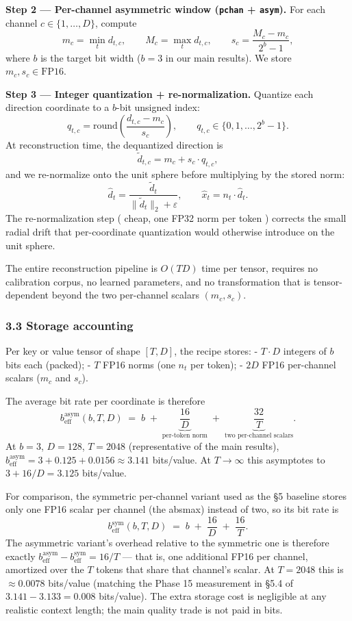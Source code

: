 \documentclass[
]{article}
\begin{document}
\textbf{Step 2 --- Per-channel asymmetric window (\texttt{pchan} +
\texttt{asym}).} For each channel \(c \in \{1, \dots, D\}\), compute \[
m_c = \min_{t} d_{t,c},\qquad M_c = \max_{t} d_{t,c},\qquad s_c = \frac{M_c - m_c}{2^{b} - 1},
\] where \(b\) is the target bit width (\(b = 3\) in our main results).
We store \(m_c, s_c \in \text{FP16}\).

\textbf{Step 3 --- Integer quantization + re-normalization.} Quantize
each direction coordinate to a \(b\)-bit unsigned index: \[
q_{t,c} = \mathrm{round}\!\left(\frac{d_{t,c} - m_c}{s_c}\right),\qquad q_{t,c} \in \{0, 1, \dots, 2^b - 1\}.
\] At reconstruction time, the dequantized direction is \[
\tilde{d}_{t,c} = m_c + s_c \cdot q_{t,c},
\] and we re-normalize onto the unit sphere before multiplying by the
stored norm: \[
\hat{d}_t = \frac{\tilde{d}_t}{\|\tilde{d}_t\|_2 + \varepsilon},\qquad \hat{x}_t = n_t \cdot \hat{d}_t.
\] The re-normalization step ( cheap, one FP32 norm per token ) corrects
the small radial drift that per-coordinate quantization would otherwise
introduce on the unit sphere.

The entire reconstruction pipeline is \(O(T D)\) time per tensor,
requires no calibration corpus, no learned parameters, and no
transformation that is tensor-dependent beyond the two per-channel
scalars \((m_c, s_c)\).

\subsubsection{3.3 Storage accounting}\label{storage-accounting}

Per key or value tensor of shape \([T, D]\), the recipe stores: -
\(T \cdot D\) integers of \(b\) bits each (packed); - \(T\) FP16 norms
(one \(n_t\) per token); - \(2D\) FP16 per-channel scalars (\(m_c\) and
\(s_c\)).

The average bit rate per coordinate is therefore \[
b_\text{eff}^\text{asym}(b, T, D) \;=\; b \;+\; \underbrace{\frac{16}{D}}_{\text{per-token norm}} \;+\; \underbrace{\frac{32}{T}}_{\text{two per-channel scalars}}.
\] At \(b = 3\), \(D = 128\), \(T = 2048\) (representative of the main
results),
\(b_\text{eff}^\text{asym} = 3 + 0.125 + 0.0156 \approx 3.141\)
bits/value. At \(T \to \infty\) this asymptotes to \(3 + 16/D = 3.125\)
bits/value.

For comparison, the symmetric per-channel variant used as the §5
baseline stores only one FP16 scalar per channel (the absmax) instead of
two, so its bit rate is \[
b_\text{eff}^\text{sym}(b, T, D) \;=\; b \;+\; \frac{16}{D} \;+\; \frac{16}{T}.
\] The asymmetric variant's overhead relative to the symmetric one is
therefore exactly
\(b_\text{eff}^\text{asym} - b_\text{eff}^\text{sym} = 16/T\) --- that
is, one additional FP16 per channel, amortized over the \(T\) tokens
that share that channel's scalar. At \(T = 2048\) this is
\(\approx 0.0078\) bits/value (matching the Phase 15 measurement in §5.4
of \(3.141 - 3.133 = 0.008\) bits/value). The extra storage cost is
negligible at any realistic context length; the main quality trade is
not paid in bits.
\end{document}
